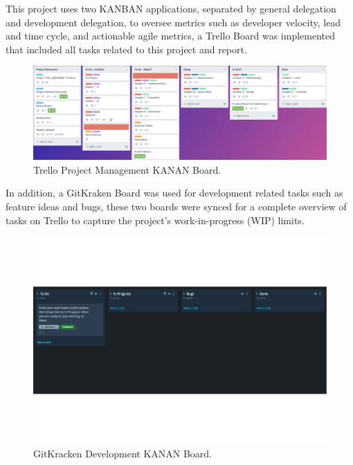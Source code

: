This project uses two KANBAN applications, separated by general delegation and development delegation, to oversee metrics such as developer velocity, lead and time cycle, and actionable agile metrics, a Trello Board was implemented that included all tasks related to this project and report.

\begin{figure}[H]
    \centering
    \includegraphics[width=\textwidth]{figures/chapter-3/trel.png}
    \caption[Trello Project Management KANAN Board]{Trello Project Management KANAN Board.
    \label{fig:TrelloKANBANpdf}}
\end{figure}

\newpage

In addition, a GitKraken Board was used for development related tasks such as feature ideas and bugs, these two boards were synced for a complete overview of tasks on Trello to capture the project’s work-in-progress (WIP) limits.

\begin{figure}[H]
    \centering
    \includegraphics[width=\textwidth]{figures/chapter-3/GitKrackenKANBANpdf.pdf}
    \caption[GitKracken Development KANAN Board]{GitKracken Development KANAN Board.
    \label{fig:GitKrackenKANBANpdf}}
\end{figure}

